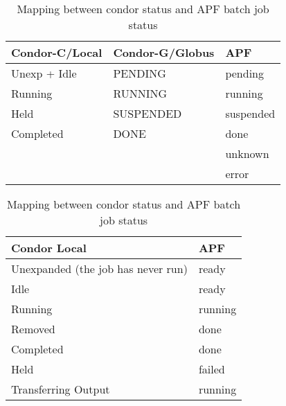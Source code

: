 \documentclass[a4paper]{jpconf}
\begin{document}
\begin{table}
   \begin{center}
      \begin{tabular}{l l l}
         \hline
         \textbf{Condor-C/Local}      &   \textbf{Condor-G/Globus}     &   \textbf{APF}        \\ 
         \hline
         Unexp + Idle        &        PENDING             &   pending    \\ 
         Running             &        RUNNING             &   running    \\ 
         Held                &        SUSPENDED           &   suspended  \\ 
         Completed           &        DONE                &   done       \\
                             &                            &   unknown    \\    
                             &                            &   error      \\ 
         \hline
      \end{tabular}
   \end{center}
   \caption{Mapping between condor status and APF batch job status}
   \label{translation}
\end{table}



\begin{table}
   \begin{center}
      \begin{tabular}{l l}
         \hline
         \textbf{Condor Local}   & \textbf{APF}       \\ 
         \hline
         Unexpanded (the job has never run)    &   ready      \\
         Idle                                  &   ready      \\
         Running                               &   running    \\
         Removed                               &   done       \\
         Completed                             &   done       \\
         Held                                  &   failed     \\
         Transferring Output                   &   running    \\
         \hline
      \end{tabular}
   \end{center}
   \caption{Mapping between condor status and APF batch job status}
   \label{translation}
\end{table}
\end{document}
